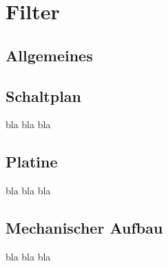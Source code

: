 \chapter{Filter}
\label{ch:concept}
\section{Allgemeines}


\section{Schaltplan}
bla bla bla

\section{Platine}
bla bla bla

\section{Mechanischer Aufbau}
bla bla bla
